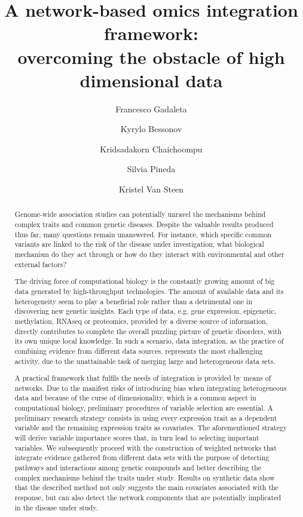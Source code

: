 \documentclass[11pt, oneside]{article}   	%
\title{A network-based omics integration framework:\\
 overcoming the obstacle of high dimensional data}
\author[1,2]{Francesco Gadaleta}
\author[1,2]{Kyrylo Bessonov}
\author[1,2]{Kridsadakorn Chaichoompu}
\author[3]{Silvia Pineda}
\author[1,2]{Kristel Van Steen}
\affil[1]{Systems and Modeling Unit, Montefiore Institute, University of Liege, Belgium}
\affil[2]{Bioinformatics and Modeling, GIGA-R, University of Liege, Belgium}
\affil[3]{Centro Nacional de Investigaciones Oncologicas, Spain}
\affil[1]{\textit {\{francesco.gadaleta, kristel.vansteen\}@ulg.ac.be}}
\date{}
\begin{document}
\maketitle

\begin{abstract}
Genome-wide association studies can potentially unravel the mechanisms behind complex traits and common genetic diseases. Despite the valuable results produced thus far, many questions remain unanswered. For instance, which specific common variants are linked to the risk of
the disease under investigation, what biological mechanism do they act through or how do they interact with environmental and other external
factors? 

The driving force of computational biology is the constantly growing amount of big data generated by high-throughput technologies. The amount of available data and its heterogeneity seem to play a beneficial role rather than a detrimental one in discovering new genetic insights. Each type of data, e.g. gene expression, epigenetic, methylation, RNAseq or proteomics, provided by a diverse source of information, directly contributes to complete the overall puzzling picture of genetic disorders, with its own unique local knowledge. In such a scenario, data integration, as the practice of combining evidence from different data sources, represents the most challenging activity, due to the unattainable task of merging large and heterogeneous data sets.

A practical framework that fulfils the needs of integration is provided by means of networks. Due to the manifest risks of introducing bias when integrating heterogeneous data and because of the curse of dimensionality, which is a common aspect in computational biology, preliminary procedures of variable selection are essential. 
A preliminary research strategy consists in using every expression trait as a dependent variable and the remaining expression traits as covariates. The aforementioned strategy will derive variable importance scores that, in turn lead to selecting important variables. We subsequently proceed with the construction of weighted networks that integrate evidence gathered from different data sets with the purpose of detecting pathways and interactions among genetic compounds and better describing the complex mechanisms behind the traits under study.
Results on synthetic data show that the described method not only suggests the main covariates associated with the response, but can also detect the network components that are potentially implicated in the disease under study.



\end{abstract}
\end{document}
